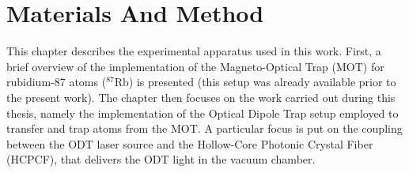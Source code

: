 \documentclass[../../thesis_main.tex]{subfiles}
\begin{document}
    \ifSubfilesClassLoaded{\tableofcontents}{}

    \setcounter{chapter}{1}
    \chapter{Materials And Method}\label{cap2}
    This chapter describes the experimental apparatus used in this work. First, a brief overview of the implementation of the Magneto-Optical Trap (MOT) for rubidium-87 atoms ($^{87}\mathrm{Rb}$) is presented (this setup was already available prior to the present work). The chapter then focuses on the work carried out during this thesis, namely the implementation of the Optical Dipole Trap setup employed to transfer and trap atoms from the MOT. A particular focus is put on the coupling between the ODT laser source and the Hollow-Core Photonic Crystal Fiber (HCPCF), that delivers the ODT light in the vacuum chamber.
    

    
    \clearpage
    
    \clearpage
    
    \clearpage
    
    
    \ifSubfilesClassLoaded{\printbibliography}{}
\end{document}

